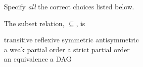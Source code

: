 \documentclass[handout]{mcs}
\begin{document}



\LARGE{
Specify \emph{all} the correct choices listed below.

The subset relation, $\subseteq$, is

\begin{center}
transitive \qquad reflexive \qquad symmetric \qquad antisymmetric\\
a weak partial order \qquad a strict partial order\\
 an equivalence \qquad a DAG
\end{center}
}


\end{document}
